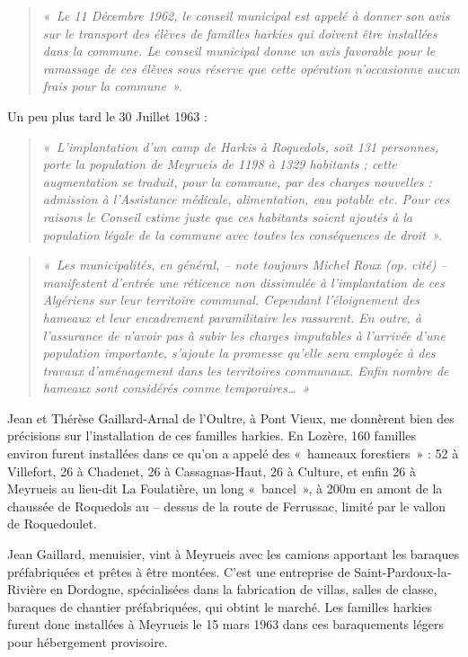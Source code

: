 \begin{quote}
\textit{«~Le 11 Décembre 1962, le conseil municipal est appelé à donner son avis sur le
transport des élèves de familles harkies qui doivent être installées dans la commune.
Le conseil municipal donne un avis favorable pour le ramassage de ces élèves sous
réserve que cette opération n’occasionne aucun frais pour la commune~».}
\end{quote}

Un peu plus tard le 30 Juillet 1963 :

\begin{quote}
\textit{«~L’implantation d’un camp de Harkis à Roquedols, soit 131 personnes, porte la
population de Meyrueis de 1198 à 1329 habitants ; cette augmentation se traduit,
pour la commune, par des charges nouvelles : admission à l’Assistance médicale,
alimentation, eau potable etc. Pour ces raisons le Conseil estime juste que ces
habitants soient ajoutés à la population légale de la commune avec toutes les
conséquences de droit~».}
\end{quote}

\begin{quote}
\textit{«~Les municipalités, en général, -- note toujours Michel Roux (op. cité) -- manifestent
d’entrée une réticence non dissimulée à l’implantation de ces Algériens sur leur
territoire communal. Cependant l’éloignement des hameaux et leur encadrement
paramilitaire les rassurent. En outre, à l’assurance de n’avoir pas à subir les charges
imputables à l’arrivée d’une population importante, s’ajoute la promesse qu’elle sera
employée à des travaux d’aménagement dans les territoires communaux. Enfin
nombre de hameaux sont considérés comme temporaires…~»}
\end{quote}


Jean et Thérèse Gaillard-Arnal de l’Oultre, à Pont Vieux, me donnèrent bien des
précisions sur l’installation de ces familles harkies. En Lozère, 160 familles environ
furent installées dans ce qu’on a appelé des «~hameaux forestiers~» : 52 à Villefort, 26
à Chadenet, 26 à Cassagnas-Haut, 26 à Culture, et enfin 26 à Meyrueis au lieu-dit La
Foulatière, un long «~bancel~», à 200m en amont de la chaussée de Roquedols au --
dessus de la route de Ferrussac, limité par le vallon de Roquedoulet.

Jean Gaillard, menuisier, vint à Meyrueis avec les camions apportant les baraques
préfabriquées et prêtes à être montées. C’est une entreprise de Saint-Pardoux-la-Rivière en Dordogne, spécialisées dans la fabrication de villas, salles de classe,
baraques de chantier préfabriquées, qui obtint le marché.
Les familles harkies furent donc installées à Meyrueis le 15 mars 1963 dans ces
baraquements légers pour hébergement provisoire.

